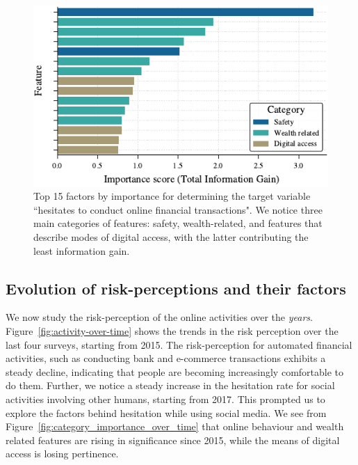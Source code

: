 \documentclass{article}
\theoremstyle{plain}
\theoremstyle{definition}
\theoremstyle{remark}
\begin{document}
\begin{figure}[t]
\includegraphics{tex/figures/HEPSPRE1_colored.pdf}
\caption{Top 15 factors by importance for determining the target variable ``hesitates to conduct online financial transactions". We notice three main categories of features: safety, wealth-related, and features that describe modes of digital access, with the latter contributing the least information gain.}

\label{fig:importance_HEPSPRE1}
\end{figure}

\subsection{Evolution of risk-perceptions and their factors}
\label{sec: temporal}
We now study the risk-perception of the online activities over the \emph{years}. Figure~\ref{fig:activity-over-time} shows the trends in the risk perception over the last four surveys, starting from 2015. The risk-perception
for automated financial activities, such as 
conducting bank and e-commerce transactions exhibits 
a steady decline, indicating that people are becoming increasingly comfortable to do them. Further, we notice a steady increase in the hesitation rate for social activities involving other humans, starting from 2017. This prompted us to explore the factors behind hesitation while using social media. We see from Figure~\ref{fig:category_importance_over_time} that online behaviour and wealth related features are rising in significance since 2015, while the means of digital access is losing pertinence.
\end{document}

